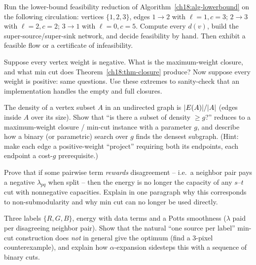 \begin{exercise}
\label{ch18:ex-lower}
Run the lower-bound feasibility reduction of Algorithm~\ref{ch18:alg-lowerbound} on the following circulation: vertices $\{1,2,3\}$, edges $1\to2$ with $\ell=1,c=3$; $2\to3$ with $\ell=2,c=2$; $3\to1$ with $\ell=0,c=5$. Compute every $d(v)$, build the super-source/super-sink network, and decide feasibility by hand. Then exhibit a feasible flow or a certificate of infeasibility.
\end{exercise}

\begin{exercise}
\label{ch18:ex-closure-neg}
Suppose every vertex weight is negative. What is the maximum-weight closure, and what min cut does Theorem~\ref{ch18:thm-closure} produce? Now suppose every weight is positive: same questions. Use these extremes to sanity-check that an implementation handles the empty and full closures.
\end{exercise}

\begin{exercise}
\label{ch18:ex-densest}
The density of a vertex subset $A$ in an undirected graph is $\lvert E(A)\rvert/\lvert A\rvert$ (edges inside $A$ over its size). Show that ``is there a subset of density $\ge g$?'' reduces to a maximum-weight closure / min-cut instance with a parameter $g$, and describe how a binary (or parametric) search over $g$ finds the densest subgraph. (Hint: make each edge a positive-weight ``project'' requiring both its endpoints, each endpoint a cost-$g$ prerequisite.)
\end{exercise}

\begin{exercise}
\label{ch18:ex-seg-hard}
Prove that if some pairwise term \emph{rewards} disagreement -- i.e.\ a neighbor pair pays a negative $\lambda_{pq}$ when split -- then the energy is no longer the capacity of any $s$--$t$ cut with nonnegative capacities. Explain in one paragraph why this corresponds to non-submodularity and why min cut can no longer be used directly.
\end{exercise}

\begin{exercise}
\label{ch18:ex-multiway}
Three labels $\{R,G,B\}$, energy with data terms and a Potts smoothness ($\lambda$ paid per disagreeing neighbor pair). Show that the natural ``one source per label'' min-cut construction does \emph{not} in general give the optimum (find a 3-pixel counterexample), and explain how $\alpha$-expansion sidesteps this with a sequence of binary cuts.
\end{exercise}

